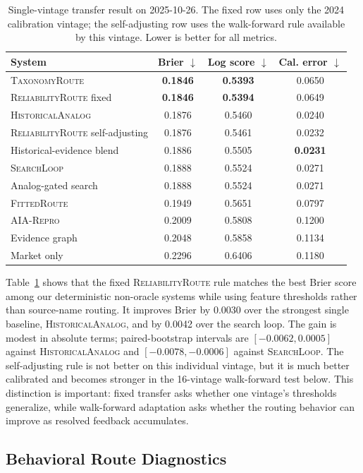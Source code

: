 \documentclass{article}
\newcommand{\tax}{\textsc{TaxonomyRoute}}
\newcommand{\rel}{\textsc{ReliabilityRoute}}
\newcommand{\fitroute}{\textsc{FittedRoute}}
\newcommand{\hist}{\textsc{HistoricalAnalog}}
\newcommand{\search}{\textsc{SearchLoop}}
\newcommand{\aialocal}{\textsc{AIA-Repro}}
\begin{document}
\begin{table}[t]
\centering
\caption{Single-vintage transfer result on 2025-10-26. The fixed row uses only the 2024 calibration vintage; the self-adjusting row uses the walk-forward rule available by this vintage. Lower is better for all metrics.}
\label{tab:main}
\begin{tabular}{lccc}
\toprule
System & Brier $\downarrow$ & Log score $\downarrow$ & Cal. error $\downarrow$ \\
\midrule
\tax{} & \textbf{0.1846} & \textbf{0.5393} & 0.0650 \\
\rel{} fixed & \textbf{0.1846} & \textbf{0.5394} & 0.0649 \\
\hist{} & 0.1876 & 0.5460 & 0.0240 \\
\rel{} self-adjusting & 0.1876 & 0.5461 & 0.0232 \\
Historical-evidence blend & 0.1886 & 0.5505 & \textbf{0.0231} \\
\search{} & 0.1888 & 0.5524 & 0.0271 \\
Analog-gated search & 0.1888 & 0.5524 & 0.0271 \\
\fitroute{} & 0.1949 & 0.5651 & 0.0797 \\
\aialocal{} & 0.2009 & 0.5808 & 0.1200 \\
Evidence graph & 0.2048 & 0.5858 & 0.1134 \\
Market only & 0.2296 & 0.6406 & 0.1180 \\
\bottomrule
\end{tabular}
\end{table}

Table~\ref{tab:main} shows that the fixed \rel{} rule matches the best Brier score among our deterministic non-oracle systems while using feature thresholds rather than source-name routing. It improves Brier by 0.0030 over the strongest single baseline, \hist{}, and by 0.0042 over the search loop. The gain is modest in absolute terms; paired-bootstrap intervals are $[-0.0062, 0.0005]$ against \hist{} and $[-0.0078, -0.0006]$ against \search{}. The self-adjusting rule is not better on this individual vintage, but it is much better calibrated and becomes stronger in the 16-vintage walk-forward test below. This distinction is important: fixed transfer asks whether one vintage's thresholds generalize, while walk-forward adaptation asks whether the routing behavior can improve as resolved feedback accumulates.

\subsection{Behavioral Route Diagnostics}
\end{document}
